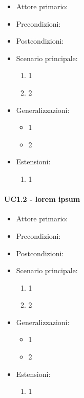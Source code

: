 \begin{itemize}
    \item Attore primario:
    \item Precondizioni:
    \item Postcondizioni:
    \item Scenario principale: \begin{enumerate}
        \item 1
        \item 2
    \end{enumerate}
    \item Generalizzazioni: \begin{itemize}
        \item 1
        \item 2
    \end{itemize}
    \item Estensioni: \begin{enumerate}
        \item 1
    \end{enumerate}
\end{itemize}

\paragraph{UC1.2 - lorem ipsum}

\begin{itemize}
    \item Attore primario:
    \item Precondizioni:
    \item Postcondizioni:
    \item Scenario principale: \begin{enumerate}
        \item 1
        \item 2
    \end{enumerate}
    \item Generalizzazioni: \begin{itemize}
        \item 1
        \item 2
    \end{itemize}
    \item Estensioni: \begin{enumerate}
        \item 1
    \end{enumerate}
\end{itemize}

